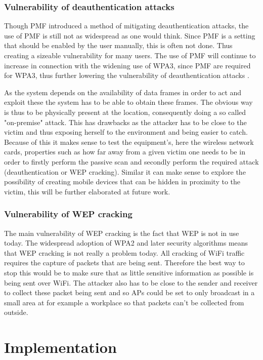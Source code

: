 \subsubsection{Vulnerability of deauthentication attacks}
Though PMF introduced a method of mitigating deauthentication attacks, the use of PMF is still not as widespread as one would think. Since PMF is a setting that should be enabled by the user manually, this is often not done. Thus creating a sizeable vulnerability for many users. The use of PMF will continue to increase in connection with the widening use of WPA3, since PMF are required for WPA3, thus further lowering the vulnerability of deauthentication attacks \cite{WPA3_info}\cite{wpa/pmf}. 

As the system depends on the availability of data frames in order to act and exploit these the system has to be able to obtain these frames. The obvious way is thus to be physically present at the location, consequently doing a so called "on-premise" attack. This has drawbacks as the attacker has to be close to the victim and thus exposing herself to the environment and being easier to catch. Because of this it makes sense to test the equipment's, here the wireless network cards, properties such as how far away from a given victim one needs to be in order to firstly perform the passive scan and secondly perform the required attack (deauthentication or WEP cracking). Similar it can make sense to explore the possibility of creating mobile devices that can be hidden in proximity to the victim, this will be further elaborated at future work. 

\subsubsection{Vulnerability of WEP cracking}
The main vulnerability of WEP cracking is the fact that WEP is not in use today. The widespread adoption of WPA2 and later security algorithms means that WEP cracking is not really a problem today. All cracking of WiFi traffic requires the capture of packets that are being sent. Therefore the best way to stop this would be to make sure that as little sensitive information as possible is being sent over WiFi. The attacker also has to be close to the sender and receiver to collect these packet being sent and so APs could be set to only broadcast in a small area at for example a workplace so that packets can't be collected from outside. 
\section{Implementation}

